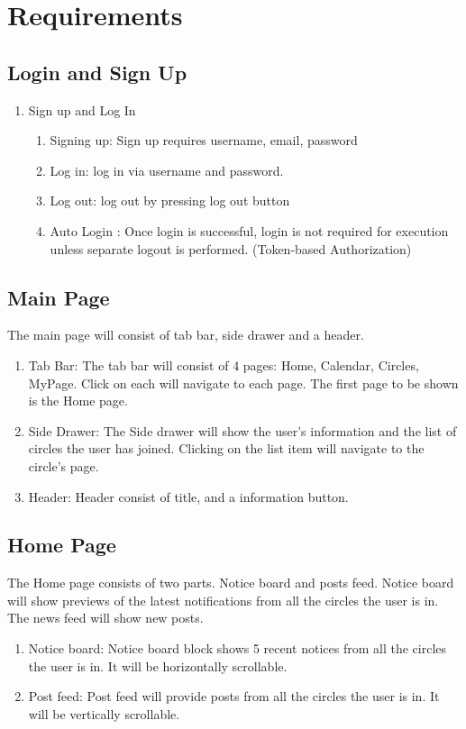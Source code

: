\documentclass[conference]{IEEEtran}
\begin{document}
\section{Requirements}
\subsection{Login and Sign Up}
\begin{enumerate}
    \item Sign up and Log In
        \begin{enumerate}
            \item Signing up: Sign up requires username, email, password
            \item Log in: log in via username and password.
            \item Log out: log out by pressing log out button
            \item Auto Login : Once login is successful, login is not required for execution unless separate logout is performed. (Token-based Authorization)
        \end{enumerate}
\end{enumerate}
\subsection{Main Page}
The main page will consist of tab bar, side drawer and a header. 
\begin{enumerate}
    \item Tab Bar: The tab bar will consist of 4 pages: Home, Calendar, Circles, MyPage. Click on each will navigate to each page. The first page to be shown is the Home page.
    \item Side Drawer: The Side drawer will show the user's information and the list of circles the user has joined. Clicking on the list item will navigate to the circle's page.
    \item Header: Header consist of title, and a information button. 
\end{enumerate}
\subsection{Home Page}
The Home page consists of two parts. Notice board and posts feed. Notice board will show previews of the latest notifications from all the circles the user is in. The news feed will show new posts.
\begin{enumerate}
    \item Notice board: Notice board block shows 5 recent notices from all the circles the user is in. It will be horizontally scrollable.
    \item Post feed: Post feed will provide posts from all the circles the user is in. It will be vertically scrollable.
\end{enumerate}
\end{document}
